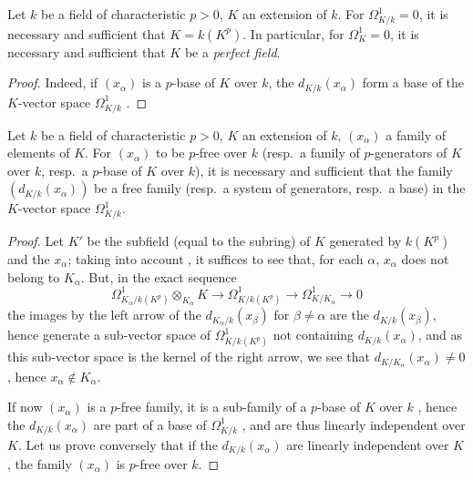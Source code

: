 \begin{corollary}[21.4.4]
\label{0.21.4.4}
Let $k$ be a field of characteristic $p>0$, $K$ an extension of $k$.
For $\Omega^1_{K/k}=0$, it is necessary and sufficient that $K=k(K^p)$.
In particular, for $\Omega^1_K=0$, it is necessary and sufficient that $K$ be a \emph{perfect field}.
\end{corollary}

\begin{proof}
Indeed, if $(x_\alpha)$ is a $p$-base of $K$ over $k$, the $d_{K/k}(x_\alpha)$ form a base of the $K$-vector space $\Omega^1_{K/k}$ .
\end{proof}

\begin{theorem}[21.4.5]
\label{0.21.4.5}
Let $k$ be a field of characteristic $p>0$, $K$ an extension of $k$, $(x_\alpha)$ a family of elements of $K$.
For $(x_\alpha)$ to be $p$-free over $k$ \textup{(}resp.\ a family of $p$-generators of $K$ over $k$, resp.\ a $p$-base of $K$ over $k$\textup{)}, it is necessary and sufficient that the family $(d_{K/k}(x_\alpha))$ be a free family \textup{(}resp.\ a system of generators, resp.\ a base\textup{)} in the $K$-vector space $\Omega^1_{K/k}$.
\end{theorem}

\begin{proof}
Let $K'$ be the subfield (equal to the subring) of $K$ generated by $k(K^p)$ and the $x_\alpha$; taking into account , it suffices to see that, for each $\alpha$, $x_\alpha$ does not belong to $K_\alpha$.
But, in the exact sequence
\[
  \Omega^1_{K_\alpha/k(K^p)}\otimes_{K_\alpha} K\to\Omega^1_{K/k(K^p)}\to\Omega^1_{K/K_\alpha}\to 0
\]
the images by the left arrow of the $d_{K_\alpha/k}(x_\beta)$ for $\beta\neq\alpha$ are the $d_{K/k}(x_\beta)$, hence generate a sub-vector space of $\Omega^1_{K/k(K^p)}$ not containing $d_{K/k}(x_\alpha)$, and as this sub-vector space is the kernel of the right arrow, we see that $d_{K/K_\alpha}(x_\alpha)\neq 0$, hence $x_\alpha\notin K_\alpha$.

If now $(x_\alpha)$ is a $p$-free family, it is a sub-family of a $p$-base of $K$ over $k$ , hence the $d_{K/k}(x_\alpha)$ are part of a base of $\Omega^1_{K/k}$ , and are thus linearly independent over $K$.
Let us prove conversely that if the $d_{K/k}(x_\alpha)$ are linearly independent over $K$, the family $(x_\alpha)$ is $p$-free over $k$.
\end{proof}

